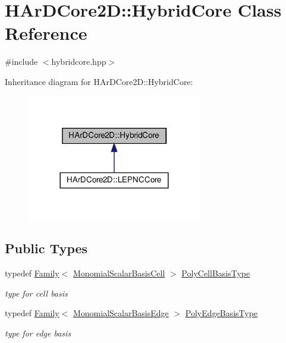 \hypertarget{classHArDCore2D_1_1HybridCore}{}\section{H\+Ar\+D\+Core2D\+:\+:Hybrid\+Core Class Reference}
\label{classHArDCore2D_1_1HybridCore}


{\ttfamily \#include $<$hybridcore.\+hpp$>$}



Inheritance diagram for H\+Ar\+D\+Core2D\+:\+:Hybrid\+Core\+:\nopagebreak
\begin{figure}[H]
\begin{center}
\leavevmode
\includegraphics[width=216pt]{classHArDCore2D_1_1HybridCore__inherit__graph}
\end{center}
\end{figure}
\subsection*{Public Types}
\begin{DoxyCompactItemize}
\item 
\mbox{\label{classHArDCore2D_1_1HybridCore_a66e8eccfa5bfc2788b2aec903bd64d4a}} 
typedef \hyperlink{classHArDCore2D_1_1Family}{Family}$<$ \hyperlink{classHArDCore2D_1_1MonomialScalarBasisCell}{Monomial\+Scalar\+Basis\+Cell} $>$ \hyperlink{classHArDCore2D_1_1HybridCore_a66e8eccfa5bfc2788b2aec903bd64d4a}{Poly\+Cell\+Basis\+Type}
\begin{DoxyCompactList}\small\item\em type for cell basis \end{DoxyCompactList}\item 
\mbox{\label{classHArDCore2D_1_1HybridCore_a76550d672e82b1b9e49ea90054b8cc6d}} 
typedef \hyperlink{classHArDCore2D_1_1Family}{Family}$<$ \hyperlink{classHArDCore2D_1_1MonomialScalarBasisEdge}{Monomial\+Scalar\+Basis\+Edge} $>$ \hyperlink{classHArDCore2D_1_1HybridCore_a76550d672e82b1b9e49ea90054b8cc6d}{Poly\+Edge\+Basis\+Type}
\begin{DoxyCompactList}\small\item\em type for edge basis \end{DoxyCompactList}\end{DoxyCompactItemize}

